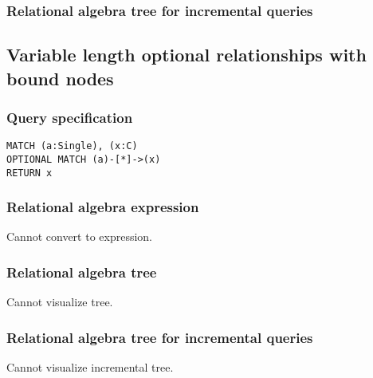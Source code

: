 \subsubsection*{Relational algebra tree for incremental queries}


\subsection{Variable length optional relationships with bound nodes}

\subsubsection*{Query specification}

\begin{lstlisting}
MATCH (a:Single), (x:C)
OPTIONAL MATCH (a)-[*]->(x)
RETURN x
\end{lstlisting}

\subsubsection*{Relational algebra expression}

Cannot convert to expression.

\subsubsection*{Relational algebra tree}

Cannot visualize tree.

\subsubsection*{Relational algebra tree for incremental queries}

Cannot visualize incremental tree.

